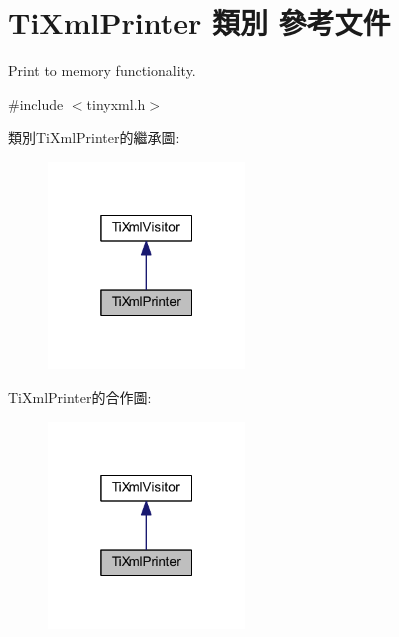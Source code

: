 \hypertarget{class_ti_xml_printer}{}\section{Ti\+Xml\+Printer 類別 參考文件}
\label{class_ti_xml_printer}


Print to memory functionality.  




{\ttfamily \#include $<$tinyxml.\+h$>$}



類別\+Ti\+Xml\+Printer的繼承圖\+:\nopagebreak
\begin{figure}[H]
\begin{center}
\leavevmode
\includegraphics[width=148pt]{class_ti_xml_printer__inherit__graph}
\end{center}
\end{figure}


Ti\+Xml\+Printer的合作圖\+:\nopagebreak
\begin{figure}[H]
\begin{center}
\leavevmode
\includegraphics[width=148pt]{class_ti_xml_printer__coll__graph}
\end{center}
\end{figure}
